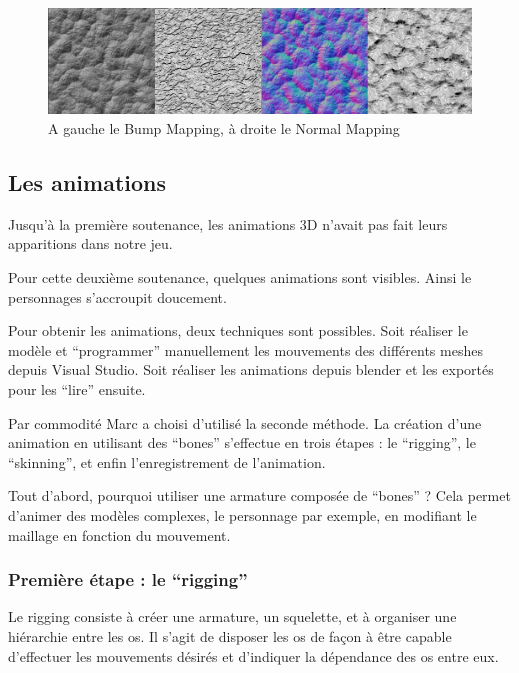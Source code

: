 \documentclass[11pt]{report}
\begin{document}
\begin{figure}[htbp]
\centering
\includegraphics[scale=0.38]{bump_vs_normal.png}
\caption{A gauche le Bump Mapping, à droite le Normal Mapping}
\end{figure}

\subsection{Les animations}

Jusqu'à la première soutenance, les animations 3D n'avait pas fait leurs apparitions dans notre jeu.

Pour cette deuxième soutenance, quelques animations sont visibles. Ainsi le personnages s'accroupit doucement.

Pour obtenir les animations, deux techniques sont possibles. Soit réaliser le modèle et ``programmer'' manuellement les mouvements des différents meshes depuis Visual Studio. Soit réaliser les animations depuis blender et les exportés pour les ``lire'' ensuite.

Par commodité Marc a choisi d’utilisé la seconde méthode. La création d’une animation en utilisant des ``bones''  s’effectue en trois étapes : le ``rigging'', le ``skinning'', et enfin l’enregistrement de l’animation.

Tout d’abord, pourquoi utiliser une armature composée de ``bones'' ?  Cela permet d’animer des modèles complexes, le personnage par exemple, en modifiant le maillage en fonction du mouvement.

\subsubsection{Première étape : le ``rigging''}

Le rigging consiste à créer une armature, un squelette, et à organiser une hiérarchie entre les os.
Il s’agit de disposer les os de façon à être capable d’effectuer les mouvements désirés et d’indiquer la dépendance des os entre eux.
\end{document}
